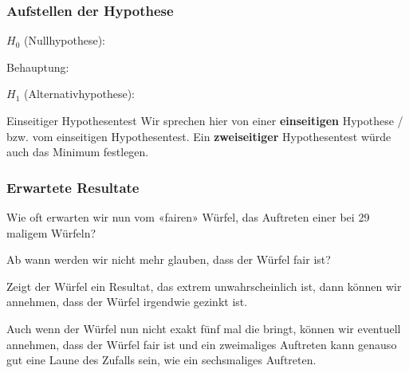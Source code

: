 \subsubsection*{Aufstellen der Hypothese}

\begin{center} $H_0$ (Nullhypothese):

\end{center}

Behauptung:

\begin{center} $H_1$ (Alternativhypothese):

\end{center}


\begin{bemerkung}{Einseitiger Hypothesentest}{}
  Wir sprechen hier von einer \textbf{einseitigen} Hypothese
/ bzw. vom einseitigen Hypothesentest. Ein \textbf{zweiseitiger}
Hypothesentest würde auch das Minimum festlegen.
\end{bemerkung}
\newpage


\newpage
\subsubsection{Erwartete Resultate}

Wie oft erwarten wir nun vom «fairen» Würfel, das Auftreten
einer  bei 29 maligem Würfeln?



Ab wann werden wir nicht mehr glauben, dass der Würfel fair ist?

Zeigt der Würfel ein Resultat, das extrem unwahrscheinlich ist, dann
können wir annehmen, dass der Würfel irgendwie gezinkt ist.

Auch wenn der Würfel nun nicht exakt fünf mal die  bringt, können
wir eventuell annehmen, dass der Würfel fair ist und ein zweimaliges
Auftreten kann genauso gut eine Laune des Zufalls sein, wie ein
sechsmaliges Auftreten.

